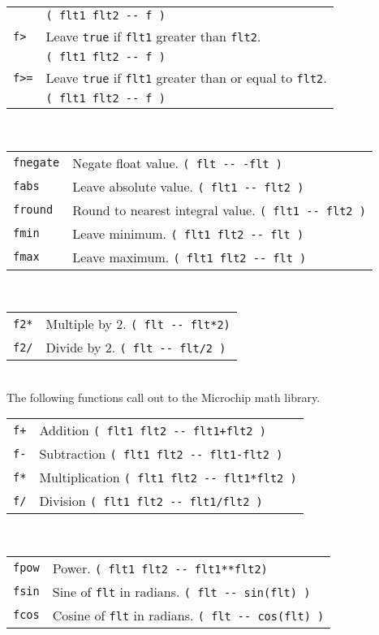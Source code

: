 \documentclass[10pt,landscape,a4paper]{article}
\begin{document}
\begin{multicols}{3}
\begin{tabular}{@{}ll@{}}
           & \verb!( flt1 flt2 -- f )! \\
\verb!f>! & Leave \verb!true! if \verb!flt1! greater than \verb!flt2!. \\
          & \verb!( flt1 flt2 -- f )! \\
\verb!f>=! & Leave \verb!true! if \verb!flt1! greater than or equal to \verb!flt2!. \\
           & \verb!( flt1 flt2 -- f )! \\
\end{tabular}\\
\begin{tabular}{@{}ll@{}}
\verb!fnegate! & Negate float value. \verb!( flt -- -flt )! \\
\verb!fabs! & Leave absolute value. \verb!( flt1 -- flt2 )! \\
\verb!fround! & Round to nearest integral value. \verb!( flt1 -- flt2 )! \\
\verb!fmin! & Leave minimum. \verb!( flt1 flt2 -- flt )! \\
\verb!fmax! & Leave maximum. \verb!( flt1 flt2 -- flt )! \\
\end{tabular}\\
\begin{tabular}{@{}ll@{}}
\verb!f2*! & Multiple by 2. \verb!( flt -- flt*2)! \\
\verb!f2/! & Divide by 2. \verb!( flt -- flt/2 )! \\
\end{tabular}\\
The following functions call out to the Microchip math library.\\
\begin{tabular}{@{}ll@{}}
\verb!f+! & Addition \verb!( flt1 flt2 -- flt1+flt2 )! \\
\verb!f-! & Subtraction \verb!( flt1 flt2 -- flt1-flt2 )! \\
\verb!f*! & Multiplication \verb!( flt1 flt2 -- flt1*flt2 )! \\
\verb!f/! & Division \verb!( flt1 flt2 -- flt1/flt2 )! \\
\end{tabular}\\
\begin{tabular}{@{}ll@{}}
\verb!fpow! & Power. \verb!( flt1 flt2 -- flt1**flt2)! \\
\verb!fsin! & Sine of \verb!flt! in radians. \verb!( flt -- sin(flt) )! \\
\verb!fcos! & Cosine of \verb!flt! in radians. \verb!( flt -- cos(flt) )! \\

\end{tabular}
\end{multicols}
\end{document}
